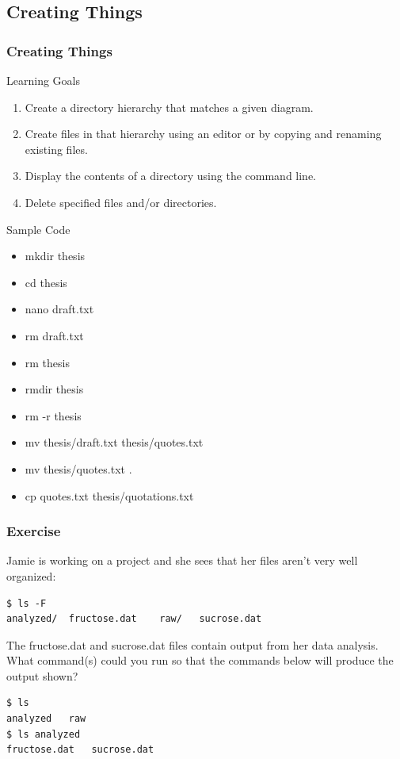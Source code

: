\documentclass{beamer}
\begin{document}
\subsection*{Creating Things}
\begin{frame}
\frametitle{Creating Things}
\small{
\begin{block}{Learning Goals}

\begin{enumerate}
\item    Create a directory hierarchy that matches a given diagram.
\item    Create files in that hierarchy using an editor or by copying and renaming existing files.
\item    Display the contents of a directory using the command line.
\item    Delete specified files and/or directories.
\end{enumerate}
\end{block}
\begin{block}{Sample Code}
\begin{multicols}{2}
\begin{itemize}
\item mkdir thesis
\item cd thesis
\item nano draft.txt
\item rm draft.txt
\item rm thesis
\item rmdir thesis
\item rm -r thesis
\item mv thesis/draft.txt thesis/quotes.txt
\item mv thesis/quotes.txt .
\item cp quotes.txt thesis/quotations.txt
\end{itemize}
\end{multicols}
\end{block}}
\end{frame}


\begin{frame}[fragile]
\frametitle{Exercise}
Jamie is working on a project and she sees that her files aren’t very well organized:
\begin{verbatim}
$ ls -F
analyzed/  fructose.dat    raw/   sucrose.dat
\end{verbatim}
The fructose.dat and sucrose.dat files contain output from her data analysis.
What command(s) could you run so that the commands below will produce the output shown?
\begin{verbatim}
$ ls
analyzed   raw
$ ls analyzed
fructose.dat   sucrose.dat
\end{verbatim}
\end{frame}
\end{document}
